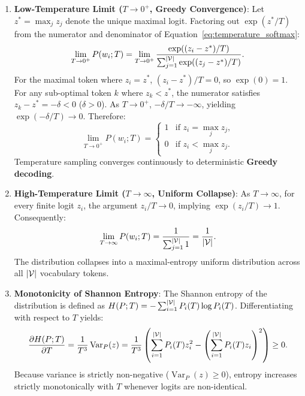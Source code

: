 \documentclass[../../main.tex]{subfiles}
\begin{document}
\begin{enumerate}
    \item \textbf{Low-Temperature Limit ($T \to 0^+$, Greedy Convergence)}:
    Let $z^* = \max_j z_j$ denote the unique maximal logit. Factoring out $\exp(z^* / T)$ from the numerator and denominator of Equation~\eqref{eq:temperature_softmax}:
    \begin{equation}
    \label{eq:temperature_zero_limit}
    \lim_{T \to 0^+} P(w_i; T) = \lim_{T \to 0^+} \frac{\exp((z_i - z^*) / T)}{\sum_{j=1}^{|\mathcal{V}|} \exp((z_j - z^*) / T)}.
    \end{equation}
    For the maximal token where $z_i = z^*$, $(z_i - z^*) / T = 0$, so $\exp(0) = 1$. For any sub-optimal token $k$ where $z_k < z^*$, the numerator satisfies $z_k - z^* = -\delta < 0$ ($\delta > 0$). As $T \to 0^+$, $-\delta / T \to -\infty$, yielding $\exp(-\delta / T) \to 0$. Therefore:
    \begin{equation}
    \lim_{T \to 0^+} P(w_i; T) = \begin{cases}
    1 & \text{if } z_i = \max_j z_j, \\
    0 & \text{if } z_i < \max_j z_j.
    \end{cases}
    \end{equation}
    Temperature sampling converges continuously to deterministic \textbf{Greedy decoding}.
    \item \textbf{High-Temperature Limit ($T \to \infty$, Uniform Collapse)}:
    As $T \to \infty$, for every finite logit $z_i$, the argument $z_i / T \to 0$, implying $\exp(z_i / T) \to 1$. Consequently:
    \begin{equation}
    \label{eq:temperature_inf_limit}
    \lim_{T \to \infty} P(w_i; T) = \frac{1}{\sum_{j=1}^{|\mathcal{V}|} 1} = \frac{1}{|\mathcal{V}|}.
    \end{equation}
    The distribution collapses into a maximal-entropy uniform distribution across all $|\mathcal{V}|$ vocabulary tokens.
    \item \textbf{Monotonicity of Shannon Entropy}:
    The Shannon entropy of the distribution is defined as $H(P; T) = -\sum_{i=1}^{|\mathcal{V}|} P_i(T) \log P_i(T)$. Differentiating with respect to $T$ yields:
    \begin{equation}
    \label{eq:entropy_temperature_monotonicity}
    \frac{\partial H(P; T)}{\partial T} = \frac{1}{T^3} \operatorname{Var}_{P}(z) = \frac{1}{T^3} \left( \sum_{i=1}^{|\mathcal{V}|} P_i(T) z_i^2 - \left(\sum_{i=1}^{|\mathcal{V}|} P_i(T) z_i\right)^2 \right) \ge 0.
    \end{equation}
    Because variance is strictly non-negative ($\operatorname{Var}_P(z) \ge 0$), entropy increases strictly monotonically with $T$ whenever logits are non-identical.
\end{enumerate}
\end{document}
